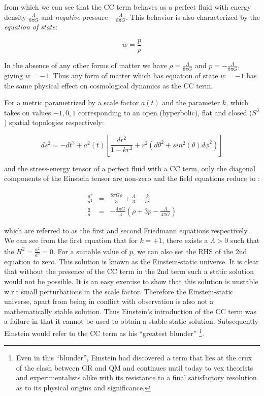 \documentclass[11pt,english,rmp]{revtex4}
\begin{document}
from which we can see that the CC term behaves as a perfect fluid
with energy density $\frac{\Lambda}{8\pi G}$ and \emph{negative}
pressure $-\frac{\Lambda}{8\pi G}$. This behavior is also characterized
by the \emph{equation of state}:

\begin{equation}
w=\frac{p}{\rho}\end{equation}


In the absence of any other forms of matter we have $\rho=\frac{\Lambda}{8\pi G}$
and $p=-\frac{\Lambda}{8\pi G}$, giving $w=-1$. Thus any form of
matter which has equation of state $w=-1$ has the same physical effect
on cosmological dynamics as the CC term.

For a metric parametrized by a scale factor $a(t)$ and the parameter
$k$, which takes on values $-1,0,1$ corresponding to an open (hyperbolic),
flat and closed ($S^{3}$) spatial topologies respectively:

\begin{equation}
ds^{2}=-dt^{2}+a^{2}(t) \left[ \frac{dr^{2}}{1-kr^{2}}+r^{2} \left( d\theta^{2}+sin^{2}(\theta)d\phi^{2} \right) \right] \end{equation}


and the stress-energy tensor of a perfect fluid with a CC term, only
the diagonal components of the Einstein tensor are non-zero and the
field equations reduce to \cite{Wald1984General}:

\begin{eqnarray}
\frac{\dot{a^{2}}}{a^{2}} & = &\frac{8\pi G\rho}{3}+\frac{\Lambda}{3}-\frac{k}{a^{2}}\label{eqn:Friedmann}\\
\frac{\ddot{a}}{a} & = & -\frac{4\pi G}{3} \left( \rho+3p-\frac{\Lambda}{4\pi G} \right) 
\end{eqnarray}


which are referred to as the first and second Friedmann equations
respectively. We can see from the first equation that for $k=+1$,
there exists a $\Lambda>0$ such that the $H^{2}=\frac{\dot{a^{2}}}{a^{2}}=0$.
For a suitable value of $p$, we can also set the RHS of the 2nd equation
to zero. This solution is known as the Einstein-static universe. It
is clear that without the presence of the CC term in the 2nd term
such a static solution would not be possible. It is an easy exercise
to show that this solution is unstable w.r.t small perturbations in
the scale factor. Therefore the Einstein-static universe, apart from
being in conflict with observation is also not a mathematically stable
solution. Thus Einstein's introduction of the CC term was a failure
in that it cannot be used to obtain a stable static solution. Subsequently
Einstein would refer to the CC term as his {}``greatest blunder''%
\footnote{Even in this {}``blunder'', Einstein had discovered a term that
lies at the crux of the clash between GR and QM and continues until
today to vex theorists and experimentalists alike with its resistance
to a final satisfactory resolution as to its physical origins and
significance.%
}.
\end{document}
